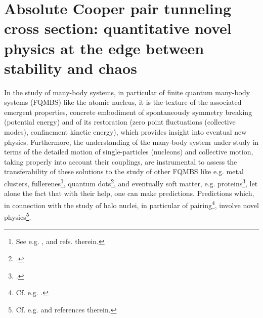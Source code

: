 \section[Absolute Cooper pair tunneling cross section]{Absolute Cooper pair tunneling cross section: quantitative novel physics at the edge between stability and chaos}\label{App3C}
In the study of many-body systems, in particular of finite quantum many-body systems (FQMBS) like the atomic nucleus,  it is the texture of the associated emergent properties, concrete embodiment of spontaneously symmetry breaking (potential energy) and of its restoration (zero point fluctuations (collective modes), confinement kinetic energy), which provides insight into  eventual new physics. Furthermore, the  understanding of the many-body system under study in terms of the detailed motion of single-particles (nucleons) and collective motion, taking properly into account their couplings, are instrumental to assess the transferability of these solutions to the study of other FQMBS like e.g. metal clusters, fullerenes\footnote{See e.g. \cite{Gunnarsson:04}, \cite{Broglia:04b} and refs. therein.}, quantum dots\footnote{\cite{Lipparini:03}.}, and eventually soft matter, e.g.  proteins\footnote{\cite{Broglia:13b}.}, let alone the fact that with their help, one can make predictions. Predictions which, in connection with the study of halo nuclei, in particular of pairing\footnote{Cf. e.g. \cite{Broglia:13}.}, involve  novel physics\footnote{Cf. e.g. \cite{Barranco:01,Tanihata:08,Potel:10} and references therein.}.



